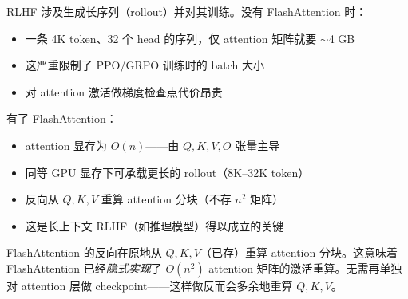 \begin{intuitionbox}
RLHF 涉及生成长序列（rollout）并对其训练。没有 FlashAttention 时：

\begin{itemize}
  \item 一条 4K token、32 个 head 的序列，仅 attention 矩阵就要 $\sim$4 GB
  \item 这严重限制了 PPO/GRPO 训练时的 batch 大小
  \item 对 attention 激活做梯度检查点代价昂贵
\end{itemize}

有了 FlashAttention：

\begin{itemize}
  \item attention 显存为 $O(n)$——由 $Q, K, V, O$ 张量主导
  \item 同等 GPU 显存下可承载更长的 rollout（8K--32K token）
  \item 反向从 $Q, K, V$ 重算 attention 分块（不存 $n^2$ 矩阵）
  \item 这是长上下文 RLHF（如推理模型）得以成立的关键
\end{itemize}
\end{intuitionbox}

\begin{warningbox}
FlashAttention 的反向在原地从 $Q, K, V$（已存）重算 attention 分块。这意味着 FlashAttention 已经\emph{隐式实现}了 $O(n^2)$ attention 矩阵的激活重算。无需再单独对 attention 层做 checkpoint——这样做反而会多余地重算 $Q, K, V$。
\end{warningbox}

